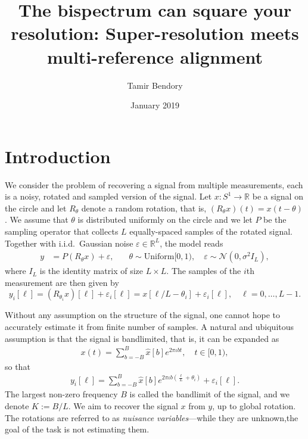 \documentclass[english,12pt]{article}
\newcommand{\I}{\iota}
\newcommand{\R}{\mathbb{R}}
\newcommand{\tB}{B}
\numberwithin{equation}{section}
\numberwithin{thm}{section} %
\begin{document}
\title{The bispectrum can square your resolution: Super-resolution meets multi-reference alignment}

\author{Tamir Bendory}
\date{January 2019}
\maketitle


\section{Introduction}

We consider the problem of recovering a signal from multiple measurements, each is a noisy, rotated and sampled version of the signal. Let $x: S^1\rightarrow\R$ be a signal on the circle and  let $R_\theta$ denote a random rotation, that is, $(R_\theta x)(t)= x(t-\theta)$. 
We assume that $\theta$ is distributed uniformly on the circle and we let $P$ be the sampling operator that collects $L$ equally-spaced samples of the rotated signal. Together with i.i.d.\ Gaussian noise $\varepsilon\in \R^L$,  the model reads
\begin{align} \label{eq:model}
y &= P(R_\theta x) + \varepsilon, \quad & \theta\sim \text{Uniform}[0,1),\quad \varepsilon\sim \mathcal{N}(0,\sigma^2 I_L),
\end{align}
where $I_L$ is the identity matrix of size $L\times L$. The  samples of the $i$th measurement are then given by
\begin{equation} \label{eq:continuous_measurements}
y_i[\ell] = \left(R_{\theta_i} x\right)[\ell] + \varepsilon_i[\ell] =  x[\ell/L-\theta_i] + \varepsilon_i[\ell], \quad \ell=0,\ldots,L-1.
\end{equation}

Without any assumption on the structure of the signal, one cannot hope to accurately estimate it from finite number of samples. 
A natural and ubiquitous assumption is that the signal is bandlimited, that is, it can  be expanded as 
\begin{eqnarray} \label{eq:fourier_expansion}
x(t) = \sum_{b=-\tB}^{\tB}\hat{x}[b]e^{2\pi\I bt }, \quad t\in[0,1),
\end{eqnarray}
so that
\begin{eqnarray} \label{eq:fourier_expansion}
y_i[\ell] = \sum_{b=-\tB}^{\tB}\hat{x}[b]e^{2\pi\I b\left(\frac{\ell}{L}+\theta_i\right) }+ \varepsilon_i[\ell].
\end{eqnarray}
The largest non-zero frequency $\tB$ is called the bandlimit of the signal, and we denote $K:=B/L$.
We aim to recover the signal $x$ from $y$, up to global rotation. The rotations are referred to as \emph{nuisance variables}---while they are unknown,the goal of the task is not estimating them.
\end{document}
